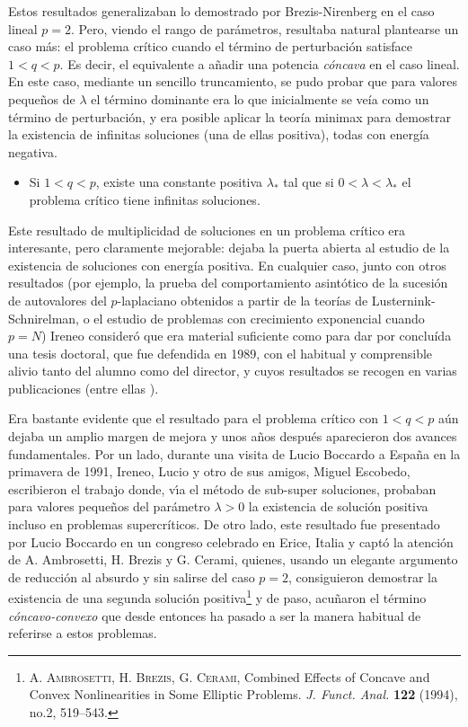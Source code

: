 Estos resultados generalizaban  lo demostrado por {Brezis-Nirenberg} en el caso lineal  $ p=2$. Pero, viendo el rango de par\'ametros, resultaba natural plantearse un caso m\'as: el problema cr\'itico cuando el t\'ermino de perturbaci\'on satisface $ 1<q<p$. Es decir, el equivalente a a\~nadir una potencia {\it c\'oncava } en el caso lineal. En este caso, mediante un sencillo truncamiento, se pudo probar que para valores peque\~nos de $ \lambda $ el t\'ermino dominante era lo que inicialmente se ve\'ia como un t\'ermino de perturbaci\'on, y era posible aplicar la teor\'ia minimax para demostrar la existencia de infinitas soluciones (una de ellas positiva),  todas con energ\'ia negativa.
\begin{itemize}
\item Si $ 1 < q < p$, existe una constante positiva $ \lambda_*$ tal que si $ 0<\lambda <  \lambda_*$ el problema cr\'itico tiene infinitas soluciones. 
\end{itemize}
Este resultado de multiplicidad de soluciones en un problema cr\'itico era interesante, pero claramente mejorable: dejaba la puerta abierta al estudio de la existencia de soluciones con energ\'ia positiva. En cualquier caso, junto con otros resultados (por ejemplo, la prueba del comportamiento asint\'otico de la sucesi\'on de autovalores del $p$-laplaciano obtenidos a partir de la teor\'ias de Lusternink-Schnirelman, o el estudio de problemas con crecimiento exponencial cuando $p=N$) Ireneo consider\'o que era material suficiente como para dar por conclu\'ida una tesis doctoral, que fue defendida en 1989, con el habitual y comprensible alivio tanto del alumno como del director, y cuyos resultados se recogen en varias publicaciones  {(entre ellas \cite{Azorero-Peral_1,Azorero-Peral_4})}. 

Era bastante evidente que el resultado para el problema cr\'itico con $1<q<p$ a\'un dejaba un amplio margen de mejora  y unos a\~nos despu\'es aparecieron dos avances fundamentales. 
Por un lado,  durante una visita de Lucio Boccardo a Espa\~na  en la primavera de 1991, Ireneo, Lucio y otro de sus amigos, Miguel Escobedo, escribieron el trabajo {\cite{Boccardo-Escobedo-Peral}} donde, v\'{\i}a el  m\'etodo de sub-super soluciones,  probaban para valores peque\~nos del par\'ametro $\lambda>0$ la existencia de soluci\'on positiva incluso en problemas supercr\'iticos.  De otro lado, este resultado fue presentado por Lucio Boccardo en un congreso  celebrado en Erice, Italia y capt\'o  la atenci\'on de A. Ambrosetti, H. Brezis y G. Cerami, quienes, usando un elegante argumento de reducci\'on al absurdo y
sin salirse del caso  $ p=2$, consiguieron demostrar la existencia de una segunda soluci\'on positiva\footnote{\textsc{A. Ambrosetti, H. Brezis, G. Cerami}, Combined Effects of Concave and Convex Nonlinearities in Some Elliptic Problems. \textit{J. Funct. Anal.}  \textbf{122} (1994), no.2, 519--543.} y de paso, acu\~naron el t\'ermino {\it c\'oncavo-convexo} que desde entonces ha pasado a ser la manera habitual de referirse a estos problemas.  

